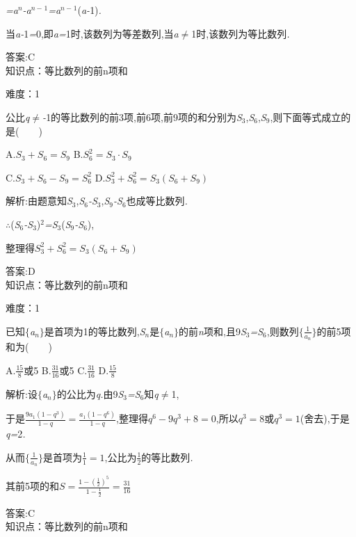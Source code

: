 \documentclass{article} %
\begin{document}
\textit{=a${}^{n}$-a${}^{n-}$}${}^{1}$\textit{=a${}^{n-}$}${}^{1}$(\textit{a-}1)\textit{.}

当\textit{a-}1\textit{=}0,即\textit{a=}1时,该数列为等差数列,当\textit{a}$\mathrm{\neq}$1时,该数列为等比数列\textit{.}

 答案:C \\

知识点：等比数列的前n项和

难度：1

 公比\textit{q}$\mathrm{\neq}$\textit{-}1的等比数列的前3项,前6项,前9项的和分别为\textit{S}${}_{3}$,\textit{S}${}_{6}$,\textit{S}${}_{9}$,则下面等式成立的是(\textit{　　})

 A.$S_3+S_6=S_9$ B.$S_6^2=S_3\cdot S_9$

 C.$S_3+S_6-S_9=S_6^2$ D.$S_3^2+S_6^2=S_3(S_6+S_9)$

 解析:由题意知\textit{S}${}_{3}$,\textit{S}${}_{6}$\textit{-S}${}_{3}$,\textit{S}${}_{9}$\textit{-S}${}_{6}$也成等比数列\textit{.}

\textit{$\therefore$}(\textit{S}${}_{6}$\textit{-S}${}_{3}$)${}^{2}$\textit{=S}${}_{3}$(\textit{S}${}_{9}$\textit{-S}${}_{6}$),

整理得$S_3^2+S_6^2=S_3(S_6+S_9)$

 答案:D \\

知识点：等比数列的前n项和

难度：1

 已知$\mathrm{\{}$\textit{a${}_{n}$}$\mathrm{\}}$是首项为1的等比数列,\textit{S${}_{n}$}是$\mathrm{\{}$\textit{a${}_{n}$}$\mathrm{\}}$的前\textit{n}项和,且9\textit{S}${}_{3}$\textit{=S}${}_{6}$,则数列$\{\frac{1}{a_n}\}$的前5项和为(\textit{　　})

 A.$\frac{15}{8}$或5 B.$\frac{31}{16}$或5 C.$\frac{31}{16}$ D.$\frac{15}{8}$

 解析:设$\mathrm{\{}$\textit{a${}_{n}$}$\mathrm{\}}$的公比为\textit{q.}由9\textit{S}${}_{3}$\textit{=S}${}_{6}$知\textit{q}$\mathrm{\neq}$1,

于是$\frac{9a_1(1-q^3)}{1-q}=\frac{a_1(1-q^6)}{1-q}$,整理得$q^6-9q^3+8=0$,所以$q^3=8$或$q^3=1$(舍去),于是\textit{q=}2\textit{.}

从而$\{\frac{1}{a_n}\}$是首项为$\frac{1}{1}=1$,公比为$\frac{1}{2}$的等比数列\textit{.}

其前5项的和$S=\frac{1-(\frac{1}{2})^5}{1-\frac{1}{2}}=\frac{31}{16}$

 答案:C \\

知识点：等比数列的前n项和
\end{document}
